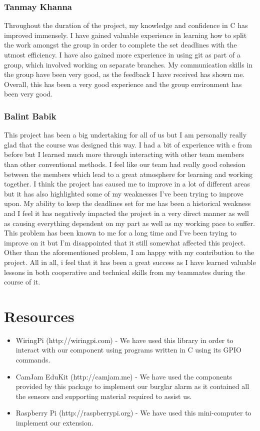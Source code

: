 \documentclass[11pt]{article}
\begin{document}
\subsubsection{Tanmay Khanna}
Throughout the duration of the project, my knowledge and confidence in C has improved immensely. I have gained valuable experience in learning how to split the work amongst the group in order to complete the set deadlines with the utmost efficiency. I have also gained more experience in using git as part of a group, which involved working on separate branches. My communication skills in the group have been very good, as the feedback I have received has shown me. Overall, this has been a very good experience and the group environment has been very good.

\subsubsection{Balint Babik}
This project has been a big undertaking for all of us but I am personally really glad that the course was designed this way. I had a bit of experience with c from before but I learned much more through interacting with other team members than other conventional methods. I feel like our team had really good cohesion between the members which lead to a great atmosphere for learning  and  working together. 
I think the project has caused me to improve in a lot of different areas but it has also highlighted some of my weaknesses I've been trying to improve upon. My ability to keep the deadlines set for me has been a historical weakness and I feel it has negatively impacted the project in a very direct manner as well as causing everything dependent on my part as well as my working pace to suffer. This problem has been known to me for a long time and I've been trying to improve on it but I'm disappointed that it still somewhat affected this project.
Other than the aforementioned problem, I am happy with my contribution to the project. All in all, i feel that it has been a great success as I have learned valuable lessons in both cooperative and technical skills from my teammates during the course of it. 

\section{Resources}
\begin{itemize}
\item WiringPi (http://wiringpi.com) - We have used this library in order to interact with our component using programs written in C using its GPIO commands.
\item CamJam EduKit (http://camjam.me) - We have used the components provided by this package to implement our burglar alarm as it contained all the sensors and supporting material required to assist us.
\item Raspberry Pi (http://raspberrypi.org) - We have used this mini-computer to implement our extension.
\end{itemize}
\end{document}
